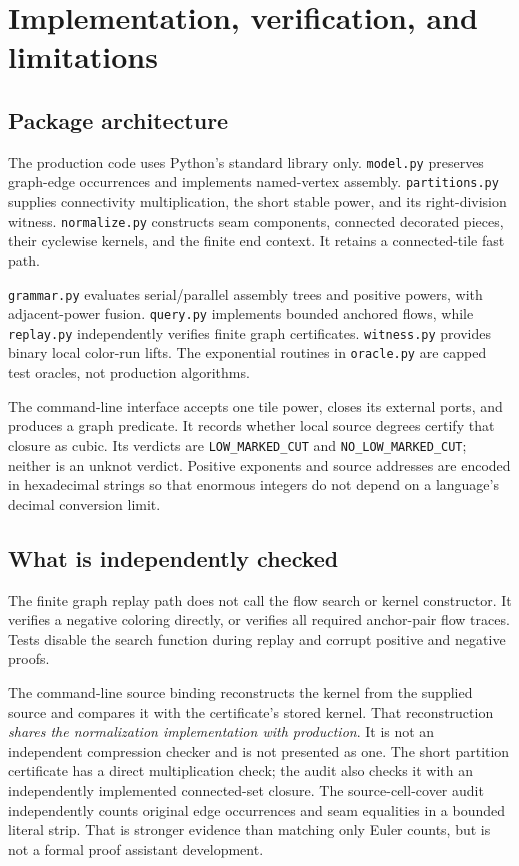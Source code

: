 \documentclass[11pt]{article}
\theoremstyle{remark}\newtheorem{remark}[theorem]{Remark}
\DeclareRobustCommand{\code}[1]{\nolinkurl{#1}}
\begin{document}
\section{Implementation, verification, and limitations}
\subsection{Package architecture}
The production code uses Python's standard library only. \code{model.py} preserves graph-edge occurrences and implements named-vertex assembly. \code{partitions.py} supplies connectivity multiplication, the short stable power, and its right-division witness. \code{normalize.py} constructs seam components, connected decorated pieces, their cyclewise kernels, and the finite end context. It retains a connected-tile fast path.

\code{grammar.py} evaluates serial/parallel assembly trees and positive powers, with adjacent-power fusion. \code{query.py} implements bounded anchored flows, while \code{replay.py} independently verifies finite graph certificates. \code{witness.py} provides binary local color-run lifts. The exponential routines in \code{oracle.py} are capped test oracles, not production algorithms.

The command-line interface accepts one tile power, closes its external ports, and produces a graph predicate. It records whether local source degrees certify that closure as cubic. Its verdicts are \code{LOW_MARKED_CUT} and \code{NO_LOW_MARKED_CUT}; neither is an unknot verdict. Positive exponents and source addresses are encoded in hexadecimal strings so that enormous integers do not depend on a language's decimal conversion limit.

\subsection{What is independently checked}
The finite graph replay path does not call the flow search or kernel constructor. It verifies a negative coloring directly, or verifies all required anchor-pair flow traces. Tests disable the search function during replay and corrupt positive and negative proofs.

The command-line source binding reconstructs the kernel from the supplied source and compares it with the certificate's stored kernel. That reconstruction \emph{shares the normalization implementation with production}. It is not an independent compression checker and is not presented as one. The short partition certificate has a direct multiplication check; the audit also checks it with an independently implemented connected-set closure. The source-cell-cover audit independently counts original edge occurrences and seam equalities in a bounded literal strip. That is stronger evidence than matching only Euler counts, but is not a formal proof assistant development.
\end{document}
